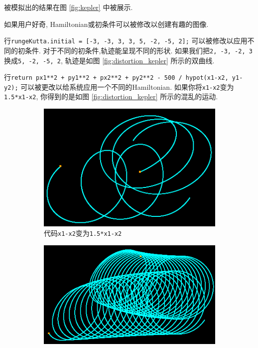 \documentclass[12pt]{article}
\begin{document}
被模拟出的结果在图 \ref{fig:kepler} 中被展示.

如果用户好奇, Hamiltonian或初条件可以被修改以创建有趣的图像.

行\texttt{rungeKutta.initial = [-3, -3, 3, 3, 5, -2, -5, 2];}
可以被修改以应用不同的初条件.
对于不同的初条件,轨迹能呈现不同的形状.
如果我们把\texttt{2, -3, -2, 3}换成\texttt{5, -2, -5, 2},
轨迹是如图 \ref{fig:distortion_kepler} 所示的双曲线.

行\texttt{return px1**2 + py1**2 + px2**2 + py2**2 - 500 / hypot(x1-x2, y1-y2);}
可以被更改以给系统应用一个不同的Hamiltonian.
如果你将\texttt{x1-x2}变为\texttt{1.5*x1-x2},
你得到的是如图 \ref{fig:distortion_kepler} 所示的混乱的运动.

\begin{figure}[h]
  \centering
  \begin{subfigure}[b]{0.4\linewidth}
    \includegraphics[width=\linewidth]{distortion_kepler.png}
    \caption{代码\texttt{x1-x2}变为\texttt{1.5*x1-x2}}
  \end{subfigure}
  \begin{subfigure}[b]{0.4\linewidth}
    \includegraphics[width=\linewidth]{distortion2_kepler.png}

\end{subfigure}
\end{figure}
\end{document}

